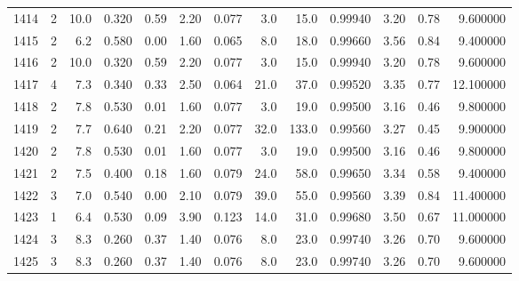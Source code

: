 \begin{tabular}{lrrrrrrrrrrrr}
1414 &        2 &           10.0 &             0.320 &         0.59 &            2.20 &      0.077 &                  3.0 &                  15.0 &  0.99940 &  3.20 &       0.78 &   9.600000 \\
1415 &        2 &            6.2 &             0.580 &         0.00 &            1.60 &      0.065 &                  8.0 &                  18.0 &  0.99660 &  3.56 &       0.84 &   9.400000 \\
1416 &        2 &           10.0 &             0.320 &         0.59 &            2.20 &      0.077 &                  3.0 &                  15.0 &  0.99940 &  3.20 &       0.78 &   9.600000 \\
1417 &        4 &            7.3 &             0.340 &         0.33 &            2.50 &      0.064 &                 21.0 &                  37.0 &  0.99520 &  3.35 &       0.77 &  12.100000 \\
1418 &        2 &            7.8 &             0.530 &         0.01 &            1.60 &      0.077 &                  3.0 &                  19.0 &  0.99500 &  3.16 &       0.46 &   9.800000 \\
1419 &        2 &            7.7 &             0.640 &         0.21 &            2.20 &      0.077 &                 32.0 &                 133.0 &  0.99560 &  3.27 &       0.45 &   9.900000 \\
1420 &        2 &            7.8 &             0.530 &         0.01 &            1.60 &      0.077 &                  3.0 &                  19.0 &  0.99500 &  3.16 &       0.46 &   9.800000 \\
1421 &        2 &            7.5 &             0.400 &         0.18 &            1.60 &      0.079 &                 24.0 &                  58.0 &  0.99650 &  3.34 &       0.58 &   9.400000 \\
1422 &        3 &            7.0 &             0.540 &         0.00 &            2.10 &      0.079 &                 39.0 &                  55.0 &  0.99560 &  3.39 &       0.84 &  11.400000 \\
1423 &        1 &            6.4 &             0.530 &         0.09 &            3.90 &      0.123 &                 14.0 &                  31.0 &  0.99680 &  3.50 &       0.67 &  11.000000 \\
1424 &        3 &            8.3 &             0.260 &         0.37 &            1.40 &      0.076 &                  8.0 &                  23.0 &  0.99740 &  3.26 &       0.70 &   9.600000 \\
1425 &        3 &            8.3 &             0.260 &         0.37 &            1.40 &      0.076 &                  8.0 &                  23.0 &  0.99740 &  3.26 &       0.70 &   9.600000 \\

\end{tabular}
